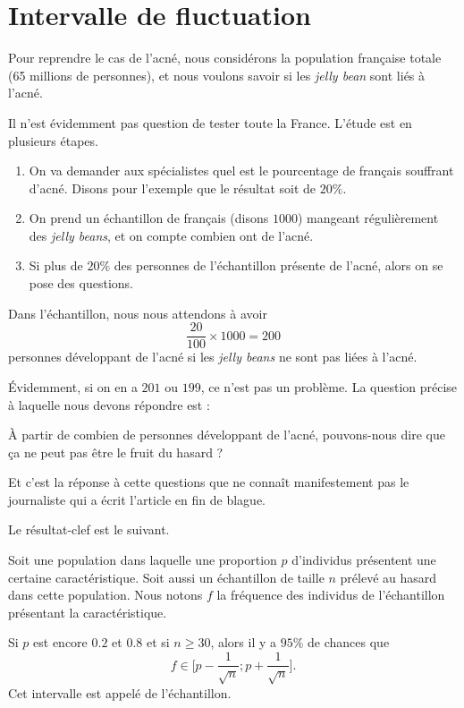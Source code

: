 \section{Intervalle de fluctuation}

Pour reprendre le cas de l'acné, nous considérons la population française totale (65 millions de personnes), et nous voulons savoir si les \emph{jelly bean} sont liés à l'acné.

Il n'est évidemment pas question de tester toute la France. L'étude est en plusieurs étapes.
\begin{enumerate}
    \item
        On va demander aux spécialistes quel est le pourcentage de français souffrant d'acné. Disons pour l'exemple que le résultat soit de \( 20\%\).
    \item
        On prend un échantillon de français (disons \( 1000\)) mangeant régulièrement des \emph{jelly beans}, et on compte combien ont de l'acné.
    \item
        Si plus de \( 20\%\) des personnes de l'échantillon présente de l'acné, alors on se pose des questions.
\end{enumerate}

Dans l'échantillon, nous nous attendons à avoir 
\begin{equation}
    \frac{ 20 }{ 100 }\times 1000=200
\end{equation}
personnes développant de l'acné si les \emph{jelly beans} ne sont pas liées à l'acné. 

Évidemment, si on en a \( 201\) ou \( 199\), ce n'est pas un problème. La question précise à laquelle nous devons répondre est :
\begin{Aretenir}
    À partir de combien de personnes développant de l'acné, pouvons-nous dire que ça ne peut pas être le fruit du hasard ?
\end{Aretenir}
Et c'est la réponse à cette questions que ne connaît manifestement pas le journaliste qui a écrit l'article en fin de blague.

Le résultat-clef est le suivant.
\begin{Aretenir}
    Soit une population dans laquelle une proportion \( p\) d'individus présentent une certaine caractéristique. Soit aussi un échantillon de taille \( n\) prélevé au hasard dans cette population. Nous notons \( f\) la fréquence des individus de l'échantillon présentant la caractéristique. 

    Si \( p\) est encore \( 0.2\) et \( 0.8\) et si \( n\geq 30\), alors il y a \( 95\%\) de chances que 
    \begin{equation}
        f\in\mathopen[ p-\frac{1}{ \sqrt{n} } ; p+\frac{1}{ \sqrt{n} } \mathclose].
    \end{equation}
    Cet intervalle est appelé  de l'échantillon.
\end{Aretenir}

